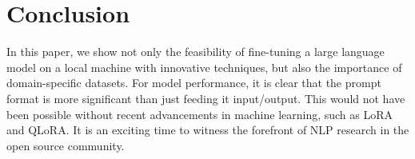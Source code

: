 \documentclass[12pt]{article}
\begin{document}
\section{Conclusion}
In this paper, we show not only the feasibility of fine-tuning a large language model on a local machine with innovative techniques, but also the importance of domain-specific datasets. For model performance, it is clear that the prompt format is more significant than just feeding it input/output. This would not have been possible without recent advancements in machine learning, such as LoRA and QLoRA. It is an exciting time to witness the forefront of NLP research in the open source community.
\newpage






 

\end{document}
